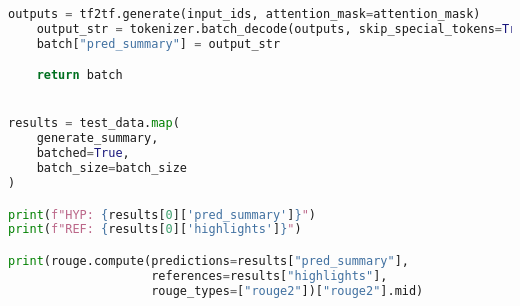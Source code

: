 \begin{lstlisting}[language=Python, caption=Quellcode zur Evaluation]
    outputs = tf2tf.generate(input_ids, attention_mask=attention_mask)
    output_str = tokenizer.batch_decode(outputs, skip_special_tokens=True)
    batch["pred_summary"] = output_str

    return batch


results = test_data.map(
    generate_summary,
    batched=True,
    batch_size=batch_size
)

print(f"HYP: {results[0]['pred_summary']}")
print(f"REF: {results[0]['highlights']}")

print(rouge.compute(predictions=results["pred_summary"],
                    references=results["highlights"],
                    rouge_types=["rouge2"])["rouge2"].mid)
\end{lstlisting}
